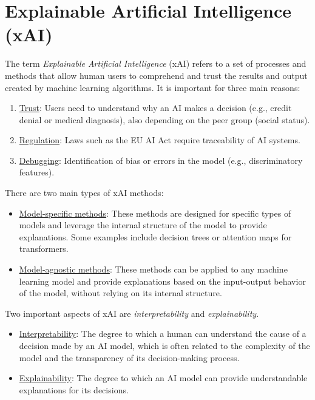 \chapter{Explainable Artificial Intelligence (xAI)}

The term \emph{Explainable Artificial Intelligence} (xAI) refers to a set of processes and methods that allow human users to comprehend and trust the results and output created by machine learning algorithms. It is important for three main reasons:
\begin{enumerate}
    \item \ul{Trust}: Users need to understand why an AI makes a decision (e.g., credit denial or medical diagnosis), also depending on the peer group (social status).
    \item \ul{Regulation}: Laws such as the EU AI Act require traceability of AI systems.
    \item \ul{Debugging}: Identification of bias or errors in the model (e.g., discriminatory features).
\end{enumerate}

There are two main types of xAI methods:
\begin{itemize}
    \item \ul{Model-specific methods}: These methods are designed for specific types of models and leverage the internal structure of the model to provide explanations. Some examples include decision trees or attention maps for transformers.
    \item \ul{Model-agnostic methods}: These methods can be applied to any machine learning model and provide explanations based on the input-output behavior of the model, without relying on its internal structure.
\end{itemize}

Two important aspects of xAI are \emph{interpretability} and \emph{explainability}.
\begin{itemize}
    \item \ul{Interpretability}: The degree to which a human can understand the cause of a decision made by an AI model, which is often related to the complexity of the model and the transparency of its decision-making process.
    \item \ul{Explainability}: The degree to which an AI model can provide understandable explanations for its decisions.
\end{itemize}


